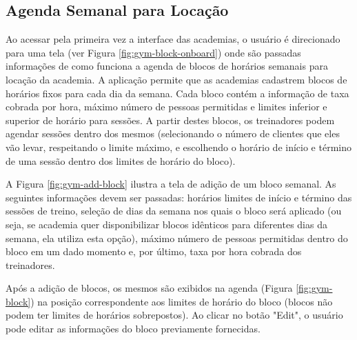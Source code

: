 \subsection{Agenda Semanal para Locação}
Ao acessar pela primeira vez a interface das academias, o usuário é direcionado para uma tela (ver Figura \ref{fig:gym-block-onboard}) onde são passadas informações de como funciona a agenda de blocos de horários semanais para locação da academia. A aplicação permite que as academias cadastrem blocos de horários fixos para cada dia da semana. Cada bloco contém a informação de taxa cobrada por hora, máximo número de pessoas permitidas e limites inferior e superior de horário para sessões. A partir destes blocos, os treinadores podem agendar sessões dentro dos mesmos (selecionando o número de clientes que eles vão levar, respeitando o limite máximo, e escolhendo o horário de início e término de uma sessão dentro dos limites de horário do bloco).

A Figura \ref{fig:gym-add-block} ilustra a tela de adição de um bloco semanal. As seguintes informações devem ser passadas: horários limites de início e término das sessões de treino, seleção de dias da semana nos quais o bloco será aplicado (ou seja, se academia quer disponibilizar blocos idênticos para diferentes dias da semana, ela utiliza esta opção), máximo número de pessoas permitidas dentro do bloco em um dado momento e, por último, taxa por hora cobrada dos treinadores.

Após a adição de blocos, os mesmos são exibidos na agenda (Figura \ref{fig:gym-block}) na posição correspondente aos limites de horário do bloco (blocos não podem ter limites de horários sobrepostos). Ao clicar no botão "Edit", o usuário pode editar as informações do bloco previamente fornecidas.

